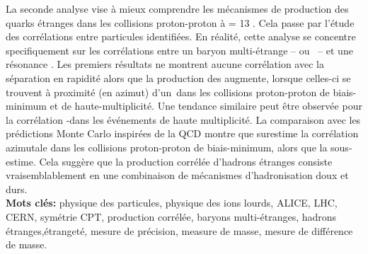 La seconde analyse vise à mieux comprendre les mécanismes de production des quarks étranges dans les collisions proton-proton à \sqrtS =  13 \tev. Cela passe par l'étude des corrélations entre particules identifiées. En réalité, cette analyse se concentre specifiquement sur les corrélations entre un baryon multi-étrange -- \rmXiPM ou \rmOmegaPM\ -- et une résonance \rmPhiMes[$s\bar{s}$]. Les premiers résultats ne montrent aucune corrélation avec la séparation en rapidité alors que la production des \rmPhiMes augmente, lorsque celles-ci se trouvent à proximité (en azimut) d'un~\rmXiPM dans les collisions proton-proton de biais-minimum et de haute-multiplicité. Une tendance similaire peut être observée pour la corrélation \rmOmegaPM-\rmPhiMes dans les événements de haute multiplicité. La comparaison avec les prédictions Monte Carlo inspirées de la QCD montre que \Pythiaeight surestime la corrélation azimutale dans les collisions proton-proton de biais-minimum, alors que \EposFour la sous-estime. Cela suggère que la production corrélée d'hadrons étranges consiste vraisemblablement en une combinaison de mécanismes d'hadronisation doux et durs.\\

\noindent\textbf{Mots clés:} physique des particules, physique des ions lourds, ALICE, LHC, CERN, symétrie CPT, production corrélée, baryons multi-étranges, hadrons étranges,\break étrangeté, mesure de précision, measure de masse, mesure de différence de masse.
    
